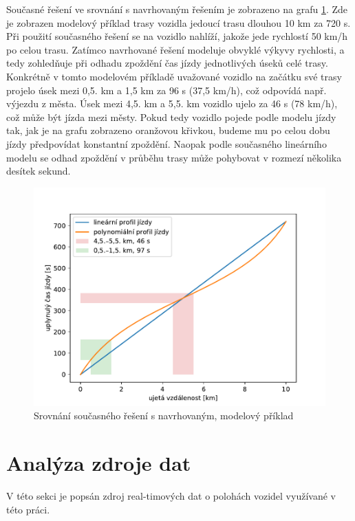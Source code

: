 \bigbreak

Současné řešení ve srovnání s navrhovaným řešením je zobrazeno na grafu \ref{fig:lin_vs_poly}. Zde je zobrazen modelový příklad trasy vozidla jedoucí trasu dlouhou 10 km za 720 s. Při použití současného řešení se na vozidlo nahlíží, jakože jede rychlostí 50 km/h po celou trasu. Zatímco navrhované řešení modeluje obvyklé výkyvy rychlosti, a tedy zohledňuje při odhadu zpoždění čas jízdy jednotlivých úseků celé trasy. Konkrétně v tomto modelovém příkladě uvažované vozidlo na začátku své trasy projelo úsek mezi 0,5. km a 1,5 km za 96 s (37,5 km/h), což odpovídá např. výjezdu z města. Úsek mezi 4,5. km a 5,5. km vozidlo ujelo za 46 s (78 km/h), což může být jízda mezi městy. Pokud tedy vozidlo pojede podle modelu jízdy tak, jak je na grafu zobrazeno oranžovou křivkou, budeme mu po celou dobu jízdy předpovídat konstantní zpoždění. Naopak podle současného lineárního modelu se odhad zpoždění v průběhu trasy může pohybovat v rozmezí několika desítek sekund.

\begin{figure}
	\centering
  \includegraphics[width=\linewidth]{../img/lin_vs_poly}
  \caption{Srovnání současného řešení s navrhovaným, modelový příklad}
  \label{fig:lin_vs_poly}
\end{figure}

\section{Analýza zdroje dat} \label{chapter:analyza_zdroje}

V této sekci je popsán zdroj real-timových dat o polohách vozidel využívané v této práci.

